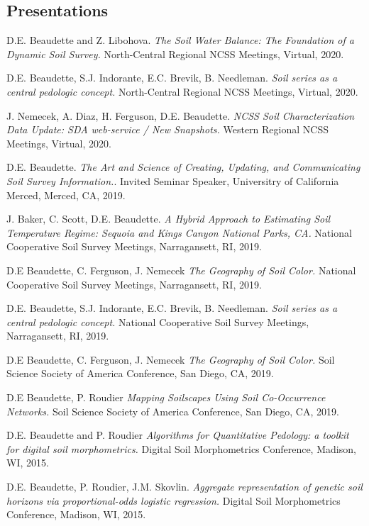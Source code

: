 \documentclass[overlapped,line,10pt,letterpaper]{res}
\begin{document}
\begin{resume}
\section{\bf Presentations}

D.E. Beaudette and Z. Libohova. {\em The Soil Water Balance: The Foundation of a Dynamic Soil Survey.} North-Central Regional NCSS Meetings, Virtual, 2020.

D.E. Beaudette, S.J. Indorante, E.C. Brevik, B. Needleman. {\em Soil series as a central pedologic concept.} North-Central Regional NCSS Meetings, Virtual, 2020.

J. Nemecek, A. Diaz, H. Ferguson, D.E. Beaudette. {\em NCSS Soil Characterization Data Update: SDA web-service / New Snapshots.} Western Regional NCSS Meetings, Virtual, 2020.

D.E. Beaudette. {\em The Art and Science of Creating, Updating, and Communicating Soil Survey Information.}. Invited Seminar Speaker, Universitry of California Merced, Merced, CA, 2019.

J. Baker, C. Scott, D.E. Beaudette. {\em A Hybrid Approach to Estimating Soil Temperature Regime: Sequoia and Kings Canyon National Parks, CA.} National Cooperative Soil Survey Meetings, Narragansett, RI, 2019.

D.E Beaudette, C. Ferguson, J. Nemecek {\em The Geography of Soil Color.} National Cooperative Soil Survey Meetings, Narragansett, RI, 2019.

D.E. Beaudette, S.J. Indorante, E.C. Brevik, B. Needleman. {\em Soil series as a central pedologic concept.} National Cooperative Soil Survey Meetings, Narragansett, RI, 2019.

D.E Beaudette, C. Ferguson, J. Nemecek {\em The Geography of Soil Color.} Soil Science Society of America Conference, San Diego, CA, 2019.

D.E Beaudette, P. Roudier {\em Mapping Soilscapes Using Soil Co-Occurrence Networks.} Soil Science Society of America Conference, San Diego, CA, 2019.

D.E. Beaudette and P. Roudier {\em Algorithms for Quantitative Pedology: a toolkit for digital soil morphometrics.} Digital Soil Morphometrics Conference, Madison, WI, 2015.

D.E. Beaudette, P. Roudier, J.M. Skovlin. {\em Aggregate representation of genetic soil horizons via proportional-odds logistic regression.} Digital Soil Morphometrics Conference, Madison, WI, 2015.


\end{resume}
\end{document}
